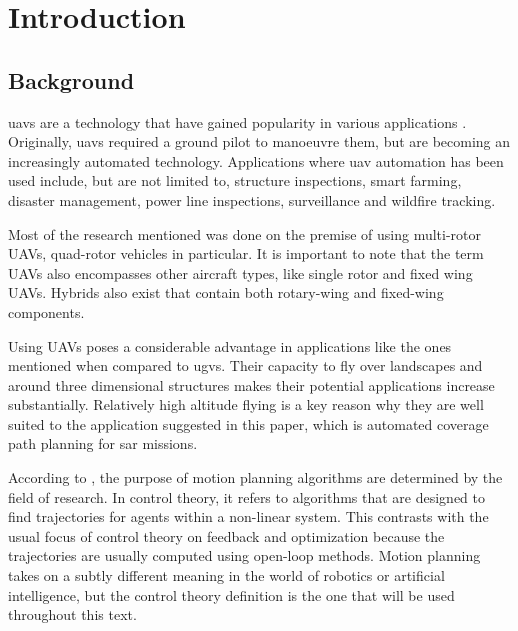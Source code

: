 \chapter{Introduction}
\label{chp:intro}

\section{Background}
\label{sec:intro_bg}
\Acfp{uav} are a technology that have gained popularity in various applications \cite{CPP-Survey-2019}. Originally, \acsp{uav} required a ground pilot to manoeuvre them, but are becoming an increasingly automated technology. Applications where \acs{uav} automation has been used include, but are not limited to, structure inspections\cite{Guerrero2013}, smart farming\cite{Lottes2017}, disaster management\cite{Maza2011}, power line inspections\cite{Chang2017}, surveillance\cite{Basilico2015} and wildfire tracking\cite{Pham2017}.

Most of the research mentioned was done on the premise of using multi-rotor UAVs, quad-rotor vehicles in particular. It is important to note that the term UAVs also encompasses other aircraft types, like single rotor and fixed wing UAVs. Hybrids also exist that contain both rotary-wing and fixed-wing components\cite{CPP-Survey-2019}.

Using UAVs poses a considerable advantage in applications like the ones mentioned when compared to \acfp{ugv}. Their capacity to fly over landscapes and around three dimensional structures makes their potential applications increase substantially. Relatively high altitude flying is a key reason why they are well suited to the application suggested in this paper, which is automated coverage path planning for \acf{sar} missions.

According to \cite{Lavalle2006}, the purpose of motion planning algorithms are determined by the field of research. In control theory, it refers to algorithms that are designed to find trajectories for agents within a non-linear system. This contrasts with the usual focus of control theory on feedback and optimization because the trajectories are usually computed using open-loop methods. Motion planning takes on a subtly different meaning in the world of robotics or artificial intelligence, but the control theory definition is the one that will be used throughout this text. 

